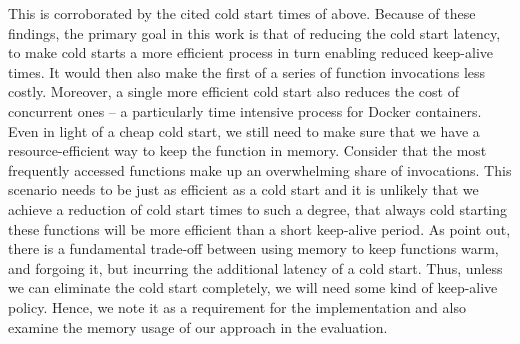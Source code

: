 This is corroborated by the cited cold start times of \citeauthor{Wang2018} above.
Because of these findings, the primary goal in this work is that of reducing the cold start latency, to make cold starts a more efficient process in turn enabling reduced keep-alive times. It would then also make the first of a series of function invocations less costly. Moreover, a single more efficient cold start also reduces the cost of concurrent ones -- a particularly time intensive process for Docker containers.
Even in light of a cheap cold start, we still need to make sure that we have a resource-efficient way to keep the function in memory. Consider that the most frequently accessed functions make up an overwhelming share of invocations. This scenario needs to be just as efficient as a cold start and it is unlikely that we achieve a reduction of cold start times to such a degree, that always cold starting these functions will be more efficient than a short keep-alive period.
As \citeauthor{Shahrad2020} point out, there is a fundamental trade-off between using memory to keep functions warm, and forgoing it, but incurring the additional latency of a cold start. Thus, unless we can eliminate the cold start completely, we will need some kind of keep-alive policy. Hence, we note it as a requirement for the implementation and also examine the memory usage of our approach in the evaluation.

